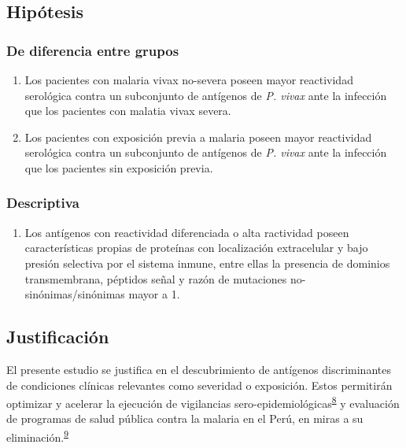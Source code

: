 \documentclass[]{article}
\providecommand{\tightlist}{%
  \setlength{\itemsep}{0pt}\setlength{\parskip}{0pt}}
\begin{document}
\subsection{Hipótesis}\label{hipotesis}

\subsubsection{De diferencia entre
grupos}\label{de-diferencia-entre-grupos}

\begin{enumerate}
\def\labelenumi{\arabic{enumi}.}
\item
  Los pacientes con malaria vivax no-severa poseen mayor reactividad
  serológica contra un subconjunto de antígenos de \emph{P. vivax} ante
  la infección que los pacientes con malatia vivax severa.
\item
  Los pacientes con exposición previa a malaria poseen mayor reactividad
  serológica contra un subconjunto de antígenos de \emph{P. vivax} ante
  la infección que los pacientes sin exposición previa.
\end{enumerate}

\subsubsection{Descriptiva}\label{descriptiva}

\begin{enumerate}
\def\labelenumi{\arabic{enumi}.}
\setcounter{enumi}{2}
\tightlist
\item
  Los antígenos con reactividad diferenciada o alta ractividad poseen
  características propias de proteínas con localización extracelular y
  bajo presión selectiva por el sistema inmune, entre ellas la presencia
  de dominios transmembrana, péptidos señal y razón de mutaciones
  no-sinónimas/sinónimas mayor a 1.
\end{enumerate}

\subsection{Justificación}\label{justif}

El presente estudio se justifica en el descubrimiento de antígenos
discriminantes de condiciones clínicas relevantes como severidad o
exposición. Estos permitirán optimizar y acelerar la ejecución de
vigilancias
sero-epidemiológicas\textsuperscript{\protect\hyperlink{ref-hotspots2015}{8}}
y evaluación de programas de salud pública contra la malaria en el Perú,
en miras a su
eliminación.\textsuperscript{\protect\hyperlink{ref-accelerate2016}{9}}
\end{document}
